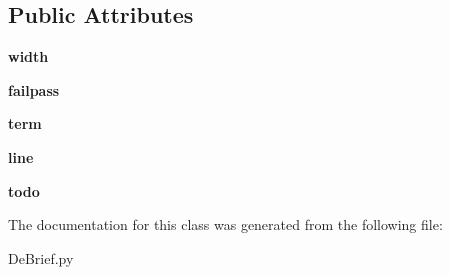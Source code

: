\subsection*{Public Attributes}
\begin{DoxyCompactItemize}
\item 
\hypertarget{classc_1_1_de_brief_1_1_de_brief_a690efc77ea8e2fa1249e204fcc222b77}{}{\bfseries width}\label{classc_1_1_de_brief_1_1_de_brief_a690efc77ea8e2fa1249e204fcc222b77}

\item 
\hypertarget{classc_1_1_de_brief_1_1_de_brief_abd36ae701bd06720247e9d85d9c5a3f5}{}{\bfseries failpass}\label{classc_1_1_de_brief_1_1_de_brief_abd36ae701bd06720247e9d85d9c5a3f5}

\item 
\hypertarget{classc_1_1_de_brief_1_1_de_brief_a81f823707a14c7d6c23aaed2f70cc40b}{}{\bfseries term}\label{classc_1_1_de_brief_1_1_de_brief_a81f823707a14c7d6c23aaed2f70cc40b}

\item 
\hypertarget{classc_1_1_de_brief_1_1_de_brief_ab5fbcfb2eed0334f1c700df98856515c}{}{\bfseries line}\label{classc_1_1_de_brief_1_1_de_brief_ab5fbcfb2eed0334f1c700df98856515c}

\item 
\hypertarget{classc_1_1_de_brief_1_1_de_brief_ab908674f6121220fcdab67a59853608f}{}{\bfseries todo}\label{classc_1_1_de_brief_1_1_de_brief_ab908674f6121220fcdab67a59853608f}

\end{DoxyCompactItemize}


The documentation for this class was generated from the following file\+:\begin{DoxyCompactItemize}
\item 
De\+Brief.\+py\end{DoxyCompactItemize}
